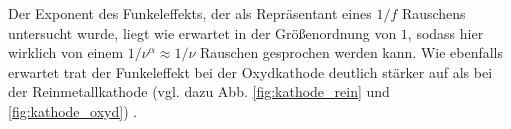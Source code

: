 Der Exponent des Funkeleffekts, der als Repräsentant eines $1/f$ 
Rauschens untersucht wurde, liegt wie erwartet in der Größenordnung 
von $1$, sodass hier wirklich von einem $1/\nu^\alpha\approx 1/\nu$ 
Rauschen gesprochen werden kann. Wie ebenfalls erwartet trat der 
Funkeleffekt bei der Oxydkathode deutlich stärker auf als bei 
der Reinmetallkathode (vgl. dazu Abb. \ref{fig:kathode_rein} und 
\ref{fig:kathode_oxyd})  .